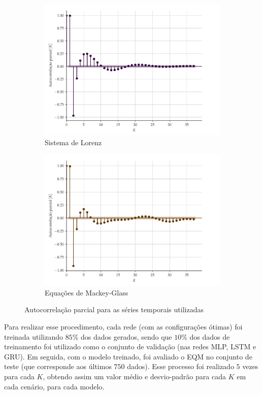\documentclass[9pt, technote]{article}
\begin{document}
\begin{figure}[H]
\begin{subfigure}[t]{0.24\textwidth}
         \includegraphics[scale=0.24]{autocorrelacao-parcial-lorenz.pdf}
         \caption{Sistema de Lorenz}
     \end{subfigure}
     \centering
     \begin{subfigure}[t]{0.24\textwidth} 
         \includegraphics[scale=0.24]{autocorrelacao-parcial-mackeyglass.pdf}
         \caption{Equações de Mackey-Glass}
     \end{subfigure}  
     \centering   
     \caption{Autocorrelação parcial para as séries temporais utilizadas}
     \label{fig:mse-progression}
\end{figure}

Para realizar esse procedimento, cada rede (com as configurações ótimas) foi treinada utilizando $85\%$ dos dados gerados, sendo que $10\%$ dos dados de treinamento foi utilizado como o conjunto de validação (nas redes MLP, LSTM e GRU). Em seguida, com o modelo treinado, foi avaliado o EQM no conjunto de teste (que corresponde aos últimos $750$ dados). Esse processo foi realizado $5$ vezes para cada $K$, obtendo assim um valor médio e desvio-padrão para cada $K$ em cada cenário, para cada modelo.
\end{document}
